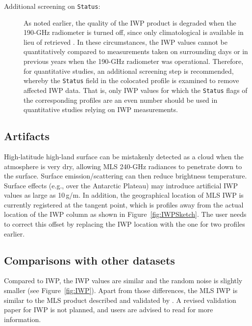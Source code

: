 \begin{nofloatpages}
\begin{description}
  \item[Additional screening on  \texttt{Status}:] As noted earlier, the quality of the IWP product is degraded when the \mbox{190\nobreakdash-GHz} radiometer is turned off, since only climatological  is available in lieu of retrieved . In these circumstances, the IWP values cannot be quantitatively compared to measurements taken on surrounding days or in previous years when the \mbox{190\nobreakdash-GHz} radiometer was operational. Therefore, for quantitative studies, an additional screening step is recommended, whereby the \texttt{Status} field in the colocated  profile is examined to remove affected IWP data. That is, only IWP values for which the \texttt{Status} flags of the corresponding  profiles are an even number should be used in quantitative studies relying on IWP measurements.    
          
\end{description}
\end{nofloatpages}

\subsection{Artifacts}

High-latitude high-land surface can be mistakenly detected as a cloud when the atmosphere is very dry, allowing MLS 240\nobreakdash-GHz radiances to penetrate down to the surface. Surface emission/scattering can then reduce brightness temperature. Surface effects (e.g., over the Antarctic Plateau) may introduce artificial IWP values as large as 10\,g/m. In addition, the geographical location of MLS IWP is currently registered at the tangent point, which is  profiles away from the actual location of the IWP column as shown in Figure~\ref{fig:IWPSketch}. The user needs to correct this offset by replacing the IWP location with the one for two profiles earlier.

\subsection{Comparisons with other datasets}
Compared to \vii IWP, the \thisv IWP values are similar and the random noise is slightly smaller (see Figure~\ref{fig:IWP}). Apart from those differences, the MLS \thisv IWP is similar to the MLS \vii product described and validated by \citet{WuEtal:2009}. A revised validation paper for IWP is not planned, and users are advised to read \citet{WuEtal:2009} for more information.


